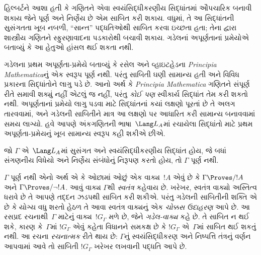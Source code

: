 \begingroup
\makeatletter{}\makeatother


\label{guunit:OLP-0278}


હિલ્બર્ટને આશા હતી કે ગણિતને એવા
સ્વયંસિદ્ધીકરણીય સિદ્ધાંતમાં ઔપચારિક બનાવી
શકાય જેને પૂર્ણ અને નિર્ણેય
છે એમ સાબિત કરી શકાય. વધુમાં, તે આ
સિદ્ધાંતની સુસંગતતા ખૂબ નબળી, ``સાન્ત''
પદ્ધતિઓથી સાબિત કરવા ઇચ્છતા હતા;
તેના દ્વારા શાસ્ત્રીય ગણિતને સ્ફુરણાવાદના
પડકારોથી બચાવી શકાય. ગડેલનાં અપૂર્ણતાનાં
પ્રમેયોએ બતાવ્યું કે આ હેતુઓ હાંસલ થઈ
શકતા નથી.

ગડેલના પ્રથમ અપૂર્ણતા-પ્રમેયે બતાવ્યું કે
રસેલ અને વ્હાઇટહેડના \emph{Principia
Mathematica}નું એક સ્વરૂપ પૂર્ણ
નથી. પરંતુ સાબિતી ઘણી સામાન્ય હતી અને
વિવિધ પ્રકારના સિદ્ધાંતોને લાગુ પડે છે. આનો
અર્થ કે \emph{Principia Mathematica}
ગણિતને સંપૂર્ણ રીતે સમાવી શક્યું નહીં એટલું
જ નહીં, પરંતુ \emph{કોઈ પણ} સ્વીકાર્ય
સિદ્ધાંત તેમ કરી શકતો નથી. અપૂર્ણતાનાં
પ્રમેયો લાગુ પડવા માટે સિદ્ધાંતનાં કયાં
લક્ષણો પૂરતાં છે તે અલગ તારવવામાં, અને
ગડેલની સાબિતીને માત્ર આ લક્ષણો પર આધારિત
કરી સામાન્ય બનાવવામાં સમય લાગ્યો.
હવે આપણે અંકગણિતની ભાષા~$\Lang L_A$માં
રચાયેલા સિદ્ધાંતો માટે પ્રથમ અપૂર્ણતા-પ્રમેયનું
ખૂબ સામાન્ય સ્વરૂપ કહી શકીએ છીએ.

\begin{thm}
જો $\Gamma$ એ~$\Lang L_A$માં સુસંગત
અને સ્વયંસિદ્ધીકરણીય સિદ્ધાંત હોય, જે બધાં
સંગણનીય વિધેયો અને નિર્ણેય સંબંધોનું
નિરૂપણ કરતો હોય, તો $\Gamma$
પૂર્ણ નથી.
\end{thm}

$\Gamma$ પૂર્ણ નથી એનો અર્થ એ
કે ઓછામાં ઓછું એક વાક્ય~$!A$ એવું
છે કે $\Gamma \Proves/ !A$ અને
$\Gamma \Proves/ \lnot !A$. આવું
વાક્ય $\Gamma$થી \emph{સ્વતંત્ર}
કહેવાય છે. ખરેખર, સ્વતંત્ર વાક્યો અસ્તિત્વ
ધરાવે છે તે આપણે તદ્દન ઝડપથી સાબિત કરી
શકીએ. પરંતુ ગડેલની સાબિતીની
શક્તિ એ છે કે યોગ્ય વધુ શરતો હેઠળ તે આવા સ્વતંત્ર
વાક્યનું એક \emph{ચોક્કસ ઉદાહરણ} આપે છે. આ
રસપ્રદ રચનાથી~$\Gamma$ માટેનું
વાક્ય~$!G_\Gamma$ મળે છે, જેને
\emph{ગડેલ-વાક્ય} કહે છે. તે સાબિત ન થઈ
શકે, કારણ કે~$\Gamma$માં $!G_\Gamma$
એવું કહેતા વિધાનને સમકક્ષ છે કે
$!G_\Gamma$ એ~$\Gamma$માં સાબિત
થઈ શકતું નથી. આ રચના \emph{રચનાત્મક}
રીતે થાય છે: $\Gamma$નું સ્વયંસિદ્ધીકરણ
અને નિષ્પત્તિ તંત્રનું વર્ણન આપવામાં
આવે તો સાબિતી $!G_\Gamma$ ખરેખર લખવાની
પદ્ધતિ આપે છે.

